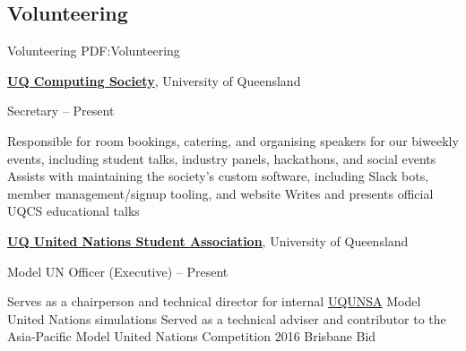 \documentclass[a4paper,10pt,oneside]{article}
\begin{document}
\begin{body}



\section
{Volunteering}
{Volunteering}
{PDF:Volunteering}

\href{https://uqcs.org.au/}
{\textbf{UQ Computing Society}}, University of Queensland

\par Secretary\hfill {} -- Present

\begin{detail}
\BulletItem Responsible for room bookings, catering, and organising speakers for our biweekly events, including student talks, industry panels, hackathons, and social events
\BulletItem Assists with maintaining the society's custom software, including Slack bots, member management/signup tooling, and website
\BulletItem Writes and presents official UQCS educational talks
\end{detail}

\EntryGap

\href{http://www.unsauq.org/}
{\textbf{UQ United Nations Student Association}}, University of Queensland

\par Model UN Officer (Executive)\hfill {} -- Present

\begin{detail}
\BulletItem Serves as a chairperson and technical director for internal \href{http://www.unsauq.org/}{UQUNSA} Model United Nations simulations 
\BulletItem Served as a technical adviser and contributor to the Asia-Pacific Model United Nations Competition 2016 Brisbane Bid
\end{detail}


\end{body}
\end{document}
